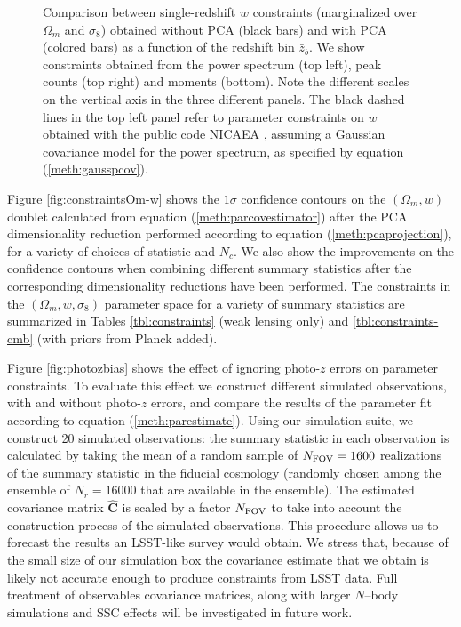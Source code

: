 \documentclass[reprint,aps,prd,superscriptaddress,showkeys,showpacs]{revtex4-1}
\newcommand{\bbh}[1]{\mathbf{\hat{#1}}}
\begin{document}
\begin{figure}
\caption{Comparison between single-redshift $w$ constraints (marginalized over $\Omega_m$ and $\sigma_8$) obtained without PCA (black bars) and with PCA (colored bars) as a function of the redshift bin $\bar{z}_b$. We show constraints obtained from the power spectrum (top left), peak counts (top right) and moments (bottom). Note the different scales on the vertical axis in the three different panels. The black dashed lines in the top left panel refer to parameter constraints on $w$ obtained with the public code NICAEA \citep{Nicaea}, assuming a Gaussian covariance model for the power spectrum, as specified by equation (\ref{meth:gausspcov}).}
\label{fig:nopca}
\end{figure}

Figure \ref{fig:constraintsOm-w} shows the $1\sigma$ confidence contours on the $(\Omega_m,w)$ doublet calculated from equation (\ref{meth:parcovestimator}) after the PCA dimensionality reduction performed according to equation (\ref{meth:pcaprojection}), for a variety of choices of statistic and $N_c$. We also show the improvements on the confidence contours when combining different summary statistics after the corresponding dimensionality reductions have been performed. The constraints in the $(\Omega_m,w,\sigma_8)$ parameter space for a variety of summary statistics are summarized in Tables \ref{tbl:constraints} (weak lensing only) and \ref{tbl:constraints-cmb} (with priors from Planck added). 

Figure \ref{fig:photozbias} shows the effect of ignoring photo-$z$ errors on parameter constraints. To evaluate this effect we construct different simulated observations, with and without photo-$z$ errors, and compare the results of the parameter fit according to equation (\ref{meth:parestimate}). Using our simulation suite, we construct 20 simulated observations: the summary statistic in each observation is calculated by taking the mean of a random sample of $N_{\rm FOV}=1600$ realizations of the summary statistic in the fiducial cosmology (randomly chosen among the ensemble of $N_r=16000$ that are available in the ensemble). The estimated covariance matrix $\bbh{C}$ is scaled by a factor $N_{\rm FOV}$ to take into account the construction process of the simulated observations. This procedure allows us to forecast the results an LSST-like survey would obtain. We stress that, because of the small size of our simulation box the covariance estimate that we obtain is likely not accurate enough to produce constraints from LSST data. Full treatment of observables covariance matrices, along with larger $N$--body simulations and SSC effects will be investigated in future work.      
\end{document}

